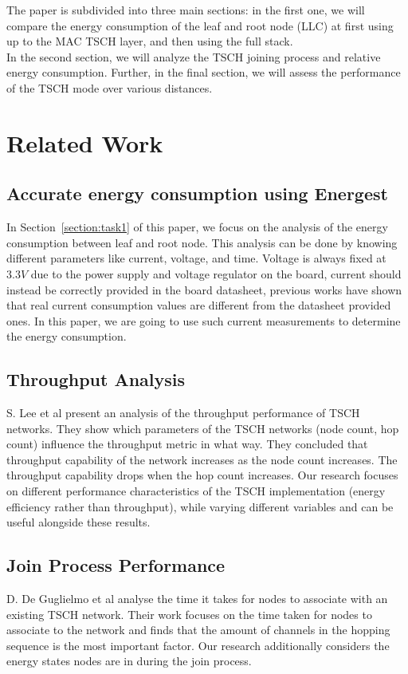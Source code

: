 \documentclass[conference]{IEEEtran}
\newcommand{\secref}[1]{Section~\ref{#1}}
\renewcommand\_{\textunderscore\allowbreak}
\begin{document}
The paper is subdivided into three main sections: in the first one, we will compare the energy consumption of the leaf and root node (LLC) at first using up to the MAC TSCH layer, and then using the full stack.\\
In the second section, we will analyze the TSCH joining process and relative energy consumption. Further, in the final section, we will assess the performance of the TSCH mode over various distances.



\section{Related Work}
\subsection{Accurate energy consumption using Energest}
In \secref{section:task1} of this paper, we focus on the analysis of the energy consumption between leaf and root node. This analysis can be done by knowing different parameters like current, voltage, and time. Voltage is always fixed at $3.3V$ due to the power supply and voltage regulator on the board, current should instead be correctly provided in the board datasheet, previous works have shown that real current consumption values are different from the datasheet provided ones\cite{EnergyConsumption}. In this paper, we are going to use such current measurements to determine the energy consumption.
\subsection{Throughput Analysis} S. Lee et al present an analysis of the throughput performance of TSCH networks. They show which parameters of the TSCH networks (node count, hop count) influence the throughput metric in what way. They concluded that throughput capability of the network increases as the node count increases. The throughput capability drops when the hop count increases. Our research focuses on different performance characteristics of the TSCH implementation (energy efficiency rather than throughput), while varying different variables and can be useful alongside these results\cite{ThroughputEvaluation}. 
\subsection{Join Process Performance} D. De Guglielmo et al analyse the time it takes for nodes to associate with an existing TSCH network. Their work focuses on the time taken for nodes to associate to the network and finds that the amount of channels in the hopping sequence is the most important factor\cite{JoinProcess}. Our research additionally considers the energy states nodes are in during the join process. 
\end{document}
